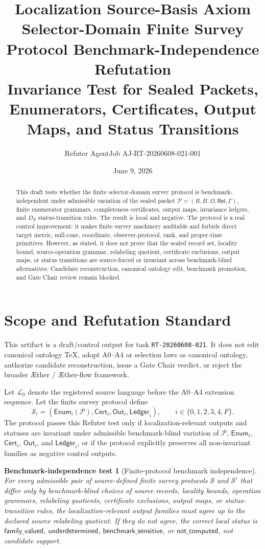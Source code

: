 \documentclass[11pt]{article}
\title{\textbf{Localization Source-Basis Axiom Selector-Domain Finite Survey Protocol Benchmark-Independence Refutation}\\[0.35em]
\large Invariance Test for Sealed Packets, Enumerators, Certificates, Output Maps, and Status Transitions}
\author{Refuter AgentJob AJ-RT-20260608-021-001}
\date{June 9, 2026}
\newcommand{\Aether}{\AE{}ther}
\newcommand{\Aflow}{\AE{}ther-flow}
\newcommand{\TheoryProgram}{\Aether{} / \Aflow{} framework}
\newcommand{\Lang}{\mathcal{L}_{0}}
\newcommand{\Pack}{\mathcal{P}}
\newcommand{\Enum}{\mathsf{Enum}}
\newcommand{\Cert}{\mathsf{Cert}}
\newcommand{\Out}{\mathsf{Out}}
\newcommand{\Ledger}{\mathsf{Ledger}}
\newcommand{\Rel}{\mathsf{Rel}}
\newcommand{\GammaB}{\Gamma}
\newtheorem{test}{Benchmark-independence test}
\begin{document}
\maketitle

\begin{abstract}
This draft tests whether the finite selector-domain survey protocol is
benchmark-independent under admissible variation of the sealed packet
\(\Pack=(R,B,\Omega,\Rel,\GammaB)\), finite enumerator grammars,
completeness certificates, output maps, invariance ledgers, and
\(D_F\) status-transition rules. The result is local and negative. The
protocol is a real control improvement: it makes finite survey machinery
auditable and forbids direct target metric, null-cone, coordinate,
observer-protocol, rank, and proper-time primitives. However, as stated, it
does not prove that the sealed record set, locality bound, source-operation
grammar, relabeling quotient, certificate exclusions, output maps, or status
transitions are source-forced or invariant across benchmark-blind
alternatives. Candidate reconstruction, canonical ontology edit, benchmark
promotion, and Gate Chair review remain blocked.
\end{abstract}

\section{Scope and Refutation Standard}

This artifact is a draft/control output for task \texttt{RT-20260608-021}.
It does not edit canonical ontology TeX, adopt A0--A4 or selection laws as
canonical ontology, authorize candidate reconstruction, issue a Gate Chair
verdict, or reject the broader \TheoryProgram{}.

Let \(\Lang\) denote the registered source language before the A0--A4
extension sequence. Let the finite survey protocol define
\[
\mathcal{S}_i=(\Enum_i(\Pack),\Cert_i,\Out_i,\Ledger_i),
\qquad i\in\{0,1,2,3,4,F\}.
\]
The protocol passes this Refuter test only if localization-relevant outputs
and statuses are invariant under admissible benchmark-blind variation of
\(\Pack\), \(\Enum_i\), \(\Cert_i\), \(\Out_i\), and \(\Ledger_i\), or if
the protocol explicitly preserves all non-invariant families as negative
control outputs.

\begin{test}[Finite-protocol benchmark independence]
For every admissible pair of source-defined finite survey protocols
\(\mathcal{S}\) and \(\mathcal{S}'\) that differ only by benchmark-blind
choices of source records, locality bounds, operation grammars, relabeling
quotients, certificate exclusions, output maps, or status-transition rules,
the localization-relevant output families must agree up to the declared
source relabeling quotient. If they do not agree, the correct local status is
\(\mathsf{family\_valued}\), \(\mathsf{underdetermined}\),
\(\mathsf{benchmark\_sensitive}\), or \(\mathsf{not\_computed}\), not
candidate support.
\end{test}
\end{document}
